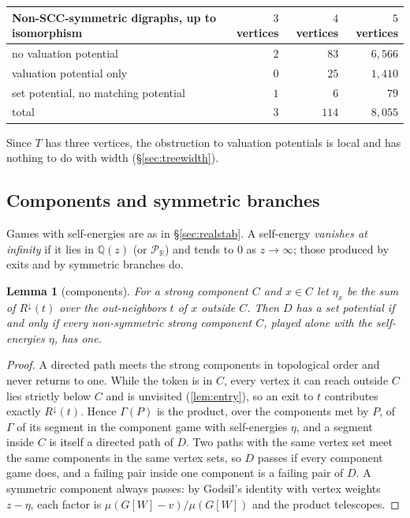\documentclass[11pt]{amsart}
\theoremstyle{plain}
\newtheorem{lemma}[theorem]{Lemma}
\theoremstyle{definition}
\theoremstyle{remark}
\numberwithin{equation}{section}
\newcommand{\QQ}{\mathbb{Q}}
\newcommand{\RR}{\mathbb{R}}
\newcommand{\Qz}{\QQ(z)}
\newcommand{\Puis}{\mathcal{P}_{\RR}}
\newcommand{\Rdown}{R^{\downarrow}}
\begin{document}
\begin{center}\small
\begin{tabular}{@{}lrrr@{}}
\toprule
Non-SCC-symmetric digraphs, up to isomorphism & $3$ vertices & $4$ vertices & $5$ vertices\\ \midrule
no valuation potential & $2$ & $83$ & $6{,}566$\\
valuation potential only & $0$ & $25$ & $1{,}410$\\
set potential, no matching potential & $1$ & $6$ & $79$\\ \midrule
total & $3$ & $114$ & $8{,}055$\\
\bottomrule
\end{tabular}
\end{center}
Since $T$ has three vertices, the obstruction to valuation potentials is local and has nothing to do with width (\S\ref{sec:treewidth}).

\subsection{Components and symmetric branches}
Games with self-energies are as in \S\ref{sec:realstab}. A self-energy \emph{vanishes at infinity} if it lies in $\Qz$ (or $\Puis$) and tends to $0$ as $z\to\infty$; those produced by exits and by symmetric branches do.

\begin{lemma}[components]\label{lem:set-components}
For a strong component $C$ and $x\in C$ let $\eta_x$ be the sum of $\Rdown(t)$ over the out-neighbors $t$ of $x$ outside $C$. Then $D$ has a set potential if and only if every non-symmetric strong component $C$, played alone with the self-energies $\eta$, has one.
\end{lemma}
\begin{proof}
A directed path meets the strong components in topological order and never returns to one. While the token is in $C$, every vertex it can reach outside $C$ lies strictly below $C$ and is unvisited (\cref{lem:entry}), so an exit to $t$ contributes exactly $\Rdown(t)$. Hence $\Gamma(P)$ is the product, over the components met by $P$, of $\Gamma$ of its segment in the component game with self-energies $\eta$, and a segment inside $C$ is itself a directed path of $D$. Two paths with the same vertex set meet the same components in the same vertex sets, so $D$ passes if every component game does, and a failing pair inside one component is a failing pair of $D$. A symmetric component always passes: by Godsil's identity with vertex weights $z-\eta$, each factor is $\mu(G[W]-v)/\mu(G[W])$ and the product telescopes.
\end{proof}
\end{document}
